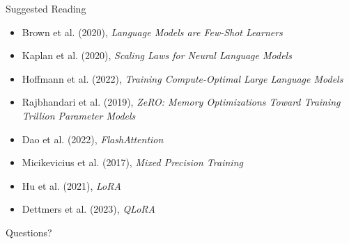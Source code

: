 \documentclass[aspectratio=169]{beamer}
\begin{document}
\begin{frame}{Suggested Reading}

\begin{itemize}
    \item Brown et al. (2020), \textit{Language Models are Few-Shot Learners}
    \item Kaplan et al. (2020), \textit{Scaling Laws for Neural Language Models}
    \item Hoffmann et al. (2022), \textit{Training Compute-Optimal Large Language Models}
    \item Rajbhandari et al. (2019), \textit{ZeRO: Memory Optimizations Toward Training Trillion Parameter Models}
    \item Dao et al. (2022), \textit{FlashAttention}
    \item Micikevicius et al. (2017), \textit{Mixed Precision Training}
    \item Hu et al. (2021), \textit{LoRA}
    \item Dettmers et al. (2023), \textit{QLoRA}
\end{itemize}

\end{frame}

\begin{frame}
\centering
\Huge Questions?
\end{frame}
\end{document}
